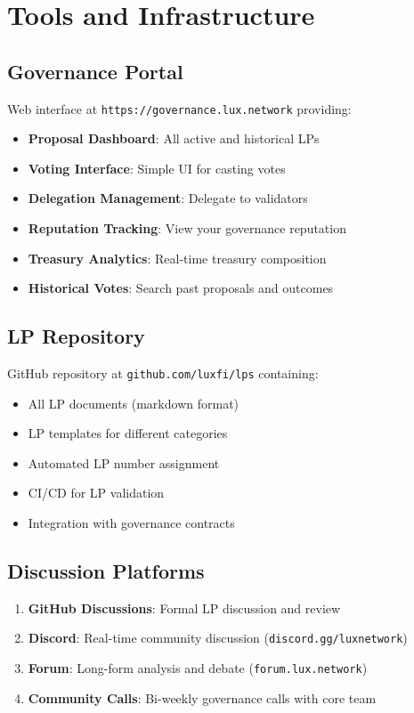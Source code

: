 \section{Tools and Infrastructure}


\subsection{Governance Portal}

Web interface at \texttt{https://governance.lux.network} providing:

\begin{itemize}
\item \textbf{Proposal Dashboard}: All active and historical LPs
\item \textbf{Voting Interface}: Simple UI for casting votes
\item \textbf{Delegation Management}: Delegate to validators
\item \textbf{Reputation Tracking}: View your governance reputation
\item \textbf{Treasury Analytics}: Real-time treasury composition
\item \textbf{Historical Votes}: Search past proposals and outcomes
\end{itemize}

\subsection{LP Repository}

GitHub repository at \texttt{github.com/luxfi/lps} containing:

\begin{itemize}
\item All LP documents (markdown format)
\item LP templates for different categories
\item Automated LP number assignment
\item CI/CD for LP validation
\item Integration with governance contracts
\end{itemize}

\subsection{Discussion Platforms}

\begin{enumerate}
\item \textbf{GitHub Discussions}: Formal LP discussion and review
\item \textbf{Discord}: Real-time community discussion (\texttt{discord.gg/luxnetwork})
\item \textbf{Forum}: Long-form analysis and debate (\texttt{forum.lux.network})
\item \textbf{Community Calls}: Bi-weekly governance calls with core team
\end{enumerate}

